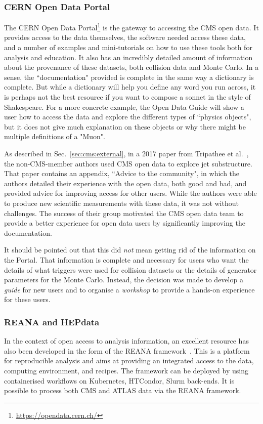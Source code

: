 \documentclass[10pt]{article}
\begin{document}
\subsubsection{CERN Open Data Portal}
\label{sssec:opendataportal}
%
The CERN Open Data Portal\footnote{\url{https://opendata.cern.ch/}} is the gateway to accessing the CMS open data. It provides access to the data themselves, the software needed access these data, and a number of examples and mini-tutorials on how to use these tools both for analysis and education. It also has an incredibly detailed amount of information about the provenance of these datasets, both collision data and Monte Carlo. In a sense, the ``documentation" provided is complete in the same way a dictionary is complete. But while a dictionary will help you define any word you run across, it is perhaps not the best resource if you want to compose a sonnet in the style of Shakespeare. For a more concrete example, the Open Data Guide will show a user how to access the data and explore the different types of ``physics objects", but it does not give much explanation on these objects or why there might be multiple definitions of a "Muon". 

As described in Sec.~\ref{sec:cms:external}, in a 2017 paper from Tripathee et al.~\cite{Tripathee:2017ybi}, the non-CMS-member authors used CMS open data to explore jet substructure. That paper contains an appendix, ``Advice to the community", in which the authors detailed their experience with the open data, both good and bad, and provided advice for improving access for other users. While the authors were able to produce new scientific measurements with these data, it was not without challenges. The success of their group motivated the CMS open data team to provide a better experience for open data users by significantly improving the documentation. 

It should be pointed out that this did {\it not} mean getting rid of the information on the Portal. That information is complete and necessary for users who want the details of what triggers were used for collision datasets or the details of generator parameters for the Monte Carlo. Instead, the decision was made to develop a {\it guide} for new users and to organise a {\it workshop} to provide a hands-on experience for these users. 


\subsubsection{REANA and HEPdata}
%
In the context of open access to analysis information, an excellent resource has also been developed in the form of the REANA framework~\cite{reana}. This is a platform for reproducible analysis and aims at providing an integrated access to the data, computing environment, and recipes. The framework can be deployed by using containerised workflows on Kubernetes, HTCondor, Slurm back-ends.  It is possible to process both CMS and ATLAS data via the REANA framework.
\end{document}
